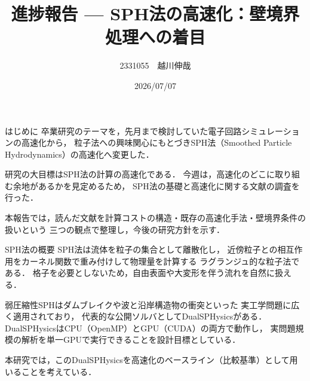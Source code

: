 \documentclass[aspectratio=169,11pt]{beamer}
\title{進捗報告 --- SPH法の高速化：壁境界処理への着目}
\author{2331055　越川伸哉}
\institute{情報工学科　前川研究室}
\date{2026/07/07}
\begin{document}
\begin{frame}
  \titlepage
\end{frame}

\begin{frame}{はじめに}
  卒業研究のテーマを，先月まで検討していた電子回路シミュレーションの高速化から，
  粒子法への興味関心にもとづきSPH法（Smoothed Particle Hydrodynamics）の高速化へ変更した．

  \vspace{1em}
  研究の大目標はSPH法の\alert{計算の高速化}である．
  今週は，高速化のどこに取り組む余地があるかを見定めるため，
  SPH法の基礎と高速化に関する文献の調査を行った．

  \vspace{1em}
  本報告では，読んだ文献を計算コストの構造・既存の高速化手法・壁境界条件の扱いという
  三つの観点で整理し，今後の研究方針を示す．
\end{frame}

\begin{frame}{SPH法の概要}
  SPH法は流体を粒子の集合として離散化し，
  近傍粒子との相互作用をカーネル関数で重み付けして物理量を計算する
  ラグランジュ的な粒子法である\cite{crespo2007}．
  格子を必要としないため，自由表面や大変形を伴う流れを自然に扱える．

  \vspace{1em}
  弱圧縮性SPHはダムブレイクや波と沿岸構造物の衝突といった
  実工学問題に広く適用されており，
  代表的な公開ソルバとしてDualSPHysicsがある\cite{dominguez2022}．
  DualSPHysicsはCPU（OpenMP）とGPU（CUDA）の両方で動作し，
  実問題規模の解析を単一GPUで実行できることを設計目標としている．

  \vspace{1em}
  本研究では，このDualSPHysicsを高速化のベースライン（比較基準）として用いることを考えている．
\end{frame}
\end{document}
